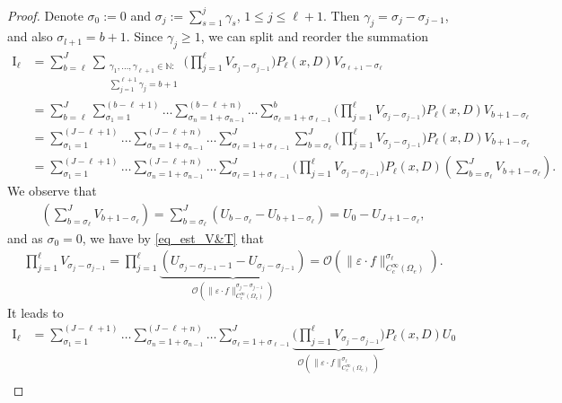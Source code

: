 \documentclass[10pt,a4paper]{amsart}
\begin{document}
\begin{proof}
Denote $\sigma_0 := 0$ and $\sigma_j := \sum_{s=1}^j\gamma_s$, $1\le j\le \ell+1$. Then $\gamma_j = \sigma_j - \sigma_{j-1}$, and also $\sigma_{l+1}=b+1$. Since $\gamma_j\ge 1$, we can split and reorder the summation 
\begin{align*}
\mathrm{I}_{\ell} &=\sum_{b=\ell}^J\sum_{\substack{ \gamma_1,\ldots, \gamma_{\ell+1}\in \mathbb{N}  : \\ \sum_{j=1}^{\ell+1}\gamma_j = b+1 }}\bigg( \prod_{j=1}^\ell V_{\sigma_j-\sigma_{j-1}} \bigg)    P_\ell(x,D)V_{{\sigma_{\ell+1}-\sigma_{\ell}}}  \\
& = 
\sum_{b=\ell}^J\sum_{\sigma_1 = 1}^{(b-\ell+1)} \ldots\sum_{\sigma_n = 1 + \sigma_{n-1}}^{(b-\ell+n)} \ldots \sum_{\sigma_{\ell}= 1+\sigma_{\ell-1} }^b\bigg( \prod_{j=1}^\ell V_{\sigma_j-\sigma_{j-1}} \bigg)    P_\ell(x,D)V_{{b+1-\sigma_{\ell}}} 
\\ & =
\sum_{\sigma_1 = 1}^{(J-\ell+1)} ... \sum_{\sigma_n = 1 + \sigma_{n-1}}^{(J-\ell+n)} \ldots \sum_{\sigma_\ell = 1 + \sigma_{\ell-1}}^{J} \sum_{b=\sigma_\ell}^J \bigg( \prod_{j=1}^\ell V_{\sigma_j-\sigma_{j-1}} \bigg)    P_\ell(x,D)V_{{b+1-\sigma_{\ell}}} \\
&=  \sum_{\sigma_1 = 1}^{(J-\ell+1)} \ldots \sum_{\sigma_n = 1 + \sigma_{n-1}}^{(J-\ell+n)}\ldots \sum_{\sigma_\ell = 1 + \sigma_{\ell-1}}^{J}  \bigg( \prod_{j=1}^\ell V_{\sigma_j-\sigma_{j-1}} \bigg)    P_\ell(x,D) \left(\sum_{b=\sigma_\ell}^JV_{b+1-\sigma_\ell}\right).
\end{align*}	
We observe that
\begin{align*}
\left(\sum_{b=\sigma_\ell}^JV_{b+1-\sigma_\ell}\right) = \sum_{b=\sigma_\ell}^J(U_{b-\sigma_\ell}- U_{b+1-\sigma_\ell}) =   U_{0} - U_{J+1-\sigma_\ell},
\end{align*}
and as $\sigma_0=0$, we have by \eqref{eq_est_V&T} that
\begin{align*}
\prod_{j=1}^\ell V_{\sigma_j-\sigma_{j-1}}  =  \prod_{j=1}^\ell \underbrace{(U_{\sigma_j-\sigma_{j-1}-1}-U_{\sigma_j-\sigma_{j-1}})}_{\mathcal{O}(\|\varepsilon\cdot f\|^{\sigma_j-\sigma_{j-1}}_{C_c^\infty(\Omega_e)})}= \mathcal{O}(\|\varepsilon\cdot f\|^{\sigma_\ell}_{C_c^\infty(\Omega_e)}).
\end{align*}	
It leads to 
\begin{align*}
\mathrm{I}_\ell 
&=  \sum_{\sigma_1 = 1}^{(J-\ell+1)} \ldots \sum_{\sigma_n = 1 + \sigma_{n-1}}^{(J-\ell+n)} \ldots \sum_{\sigma_\ell = 1 + \sigma_{\ell-1}}^{J}  \underbrace{\bigg( \prod_{j=1}^\ell V_{\sigma_j-\sigma_{j-1}} \bigg)}_{ \mathcal{O}(\|\varepsilon\cdot f\|^{\sigma_\ell}_{C_c^\infty(\Omega_e)})}    P_\ell(x,D) U_0\\

\end{align*}
\end{proof}
\end{document}
